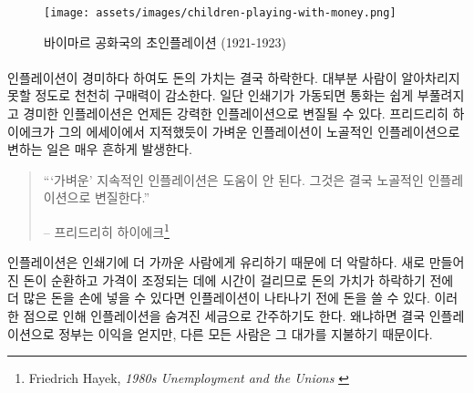 \begin{figure}
	\texttt{[image: assets/images/children-playing-with-money.png]}
	\caption{바이마르 공화국의 초인플레이션 (1921-1923)}
	\label{fig:children-playing-with-money}
\end{figure}

\paragraph{}
인플레이션이 경미하다 하여도 돈의 가치는 결국 하락한다. 
대부분 사람이 알아차리지 못할 정도로 천천히 구매력이 감소한다. 
일단 인쇄기가 가동되면 통화는 쉽게 부풀려지고 경미한 인플레이션은 언제든 강력한 인플레이션으로 변질될 수 있다. 
프리드리히 하이에크가 그의 에세이에서 지적했듯이 
가벼운 인플레이션이 노골적인 인플레이션으로 변하는 일은 매우 흔하게 발생한다.

\begin{quotation}\begin{samepage}
		\enquote{`가벼운' 지속적인 인플레이션은 도움이 안 된다. 그것은 결국 노골적인 인플레이션으로 변질한다.}
		\begin{flushright} -- 프리드리히 하이에크\footnote{Friedrich Hayek, \textit{1980s
					Unemployment and the Unions} \cite{hayek-inflation}}
\end{flushright}\end{samepage}\end{quotation}

인플레이션은 인쇄기에 더 가까운 사람에게 유리하기 때문에 더 악랄하다. 
새로 만들어진 돈이 순환하고 가격이 조정되는 데에 시간이 걸리므로 
돈의 가치가 하락하기 전에 더 많은 돈을 손에 넣을 수 있다면
인플레이션이 나타나기 전에 돈을 쓸 수 있다. 
이러한 점으로 인해 인플레이션을 숨겨진 세금으로 간주하기도 한다.
왜냐하면 결국 인플레이션으로 정부는 이익을 얻지만, 다른 모든 사람은 그 대가를 지불하기 때문이다.

